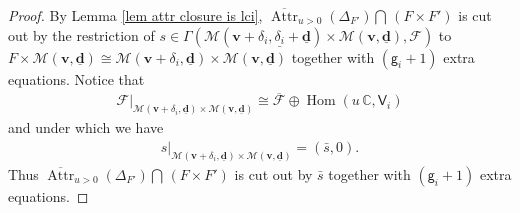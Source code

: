 \documentclass[10pt]{amsart}
\theoremstyle{definition}
\numberwithin{equation}{section}
\newcommand{\bC}{\mathbb{C}}
\newcommand{\bv}{\mathbf{v}}
\newcommand{\bd}{\mathbf{d}}
\newcommand{\cM}{\mathcal{M}}
\newcommand{\Attr}{\operatorname{Attr}}
\newcommand{\Hom}{\operatorname{Hom}}
\begin{document}
\begin{proof}
By Lemma \ref{lem attr closure is lci}, $\overline{\Attr}_{u>0}(\Delta_{F'})\bigcap\,(F\times F')$ is cut out by the restriction of $s\in \Gamma( \cM(\bv+\delta_i,\underline{\delta_i}+\underline{\bd})\times\cM(\bv,\underline{\bd}),\mathcal F)$ to $F\times \cM(\bv,\underline{\bd})\cong \cM(\bv+\delta_i,\underline{\bd})\times \cM(\bv,\underline{\bd})$ together with $(\mathsf g_i+1)$ extra equations. Notice that
\begin{align}\label{res of F}
    \mathcal F\big|_{\cM(\bv+\delta_i,\underline{\bd})\times \cM(\bv,\underline{\bd})}\cong \overline{\mathcal F}\oplus \Hom(u\,\bC,\mathsf V_i)
\end{align}
and under which we have 
\begin{align*}
    s\big|_{\cM(\bv+\delta_i,\underline{\bd})\times \cM(\bv,\underline{\bd})}=(\bar s,0).
\end{align*}
Thus $\overline{\Attr}_{u>0}(\Delta_{F'})\bigcap\,(F\times F')$ is cut out by $\bar s$ together with $(\mathsf g_i+1)$ extra equations. 


\end{proof}
\end{document}
